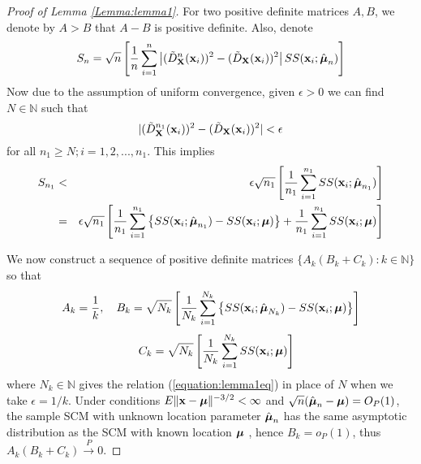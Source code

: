 \documentclass[fleqn,11pt]{article}
\begin{document}
\begin{proof}[Proof of Lemma \ref{Lemma:lemma1}]
For two positive definite matrices $A,B$, we denote by $A>B$ that $A-B$ is positive definite. Also, denote
%
$$ S_n = \sqrt n \left[ \frac{1}{n} \sum_{i=1}^n \left| (\tilde D^{n} _{\mathbf{X}} ({\bf{x}}_i))^2  - (\tilde D_{\mathbf{X}} ({\bf{x}}_i))^2 \right| SS({\bf{x}}_i; \hat{{\boldsymbol{\mu}}}_n) \right] $$
%
Now due to the assumption of uniform convergence, given $\epsilon>0$ we can find $N \in \mathbb{N}$ such that
%
\begin{equation}
\label{equation:lemma1eq}
| (\tilde D^{n_1}_{\mathbf{X}}({\bf{x}}_i))^2 - (\tilde D_{\mathbf{X}}({\bf{x}}_i))^2 | < \epsilon
\end{equation}
%
for all $n_1 \geq N; i = 1,2,...,n_1$. This implies
%
\begin{eqnarray}
\label{eqn:lemma1eq2}
S_{n_1} &< & \epsilon \sqrt{n_1} \left[ \frac{1}{n_1} \sum_{i=1}^{n_1} SS({\bf{x}}_i; \hat{{\boldsymbol{\mu}}}_{n_1}) \right]\notag\\
&=& \epsilon \sqrt{n_1} \left[ \frac{1}{n_1} \sum_{i=1}^{n_1} \left\{ SS({\bf{x}}_i; \hat{{\boldsymbol{\mu}}}_{n_1}) - SS({\bf{x}}_i; {\boldsymbol{\mu}}) \right\} + \frac{1}{n_1} \sum_{i=1}^{n_1} SS({\bf{x}}_i; {\boldsymbol{\mu}}) \right]
\end{eqnarray}

We now construct a sequence of positive definite matrices $\{A_k (B_k+C_k) : k \in \mathbb N\} $ so that
%
$$ A_k = \frac{1}{k}, \quad B_k = \sqrt{N_k} \left[ \frac{1}{N_k} \sum_{i=1}^{N_k} \left\{ SS({\bf{x}}_i; \hat{{\boldsymbol{\mu}}}_{N_k}) - SS({\bf{x}}_i; {\boldsymbol{\mu}}) \right\} \right]$$
$$\quad C_k = \sqrt{N_k} \left[ \frac{1}{N_k} \sum_{i=1}^{N_k} SS({\bf{x}}_i; {\boldsymbol{\mu}}) \right] $$
%
where $N_k \in \mathbb N$ gives the relation (\ref{equation:lemma1eq}) in place of $N$ when we take $\epsilon = 1/k$. Under conditions $ E\|{\bf{x}} - {\boldsymbol{\mu}}\|^{-3/2} < \infty $ and $\sqrt n (\hat{{\boldsymbol{\mu}}}_n - {\boldsymbol{\mu}}) = O_P(1)$, the sample SCM with unknown location parameter $\hat{{\boldsymbol{\mu}}}_n$ has the same asymptotic distribution as the SCM with known location ${\boldsymbol{\mu}}$ \citep{durre14}, hence $B_k = o_P(1)$, thus $A_k (B_k+C_k) \stackrel{P}{\rightarrow} 0$.


\end{proof}
\end{document}
